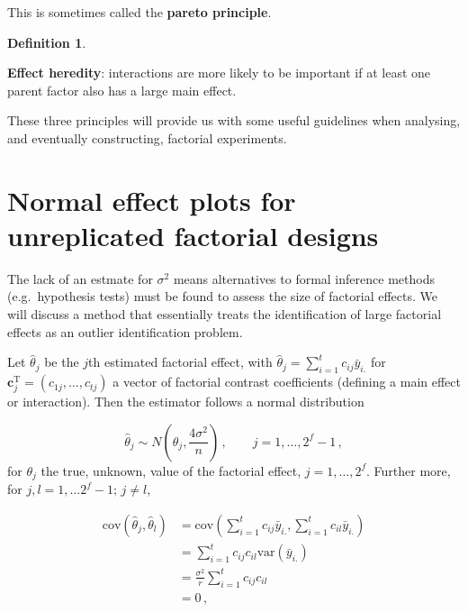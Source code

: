 \documentclass[
]{book}
\theoremstyle{definition}
\newtheorem{definition}{Definition}[chapter]
\theoremstyle{definition}
\theoremstyle{definition}
\theoremstyle{definition}
\theoremstyle{remark}
\begin{document}
This is sometimes called the \textbf{pareto principle}.

\begin{definition}
\protect\hypertarget{def:effect-heredity}{}\label{def:effect-heredity}

\textbf{Effect heredity}: interactions are more likely to be important if at least one parent factor also has a large main effect.

\end{definition}

These three principles will provide us with some useful guidelines when analysing, and eventually constructing, factorial experiments.

\hypertarget{unreplicated-normal-plots}{%
\section{Normal effect plots for unreplicated factorial designs}\label{unreplicated-normal-plots}}

The lack of an estmate for \(\sigma^2\) means alternatives to formal inference methods (e.g.~hypothesis tests) must be found to assess the size of factorial effects. We will discuss a method that essentially treats the identification of large factorial effects as an outlier identification problem.

Let \(\hat{\theta}_j\) be the \(j\)th estimated factorial effect, with \(\hat{\theta}_j = \sum_{i=1}^tc_{ij}\bar{y}_{i.}\) for \(\boldsymbol{c}_j^{\mathrm{T}} = (c_{1j}, \ldots, c_{tj})\) a vector of factorial contrast coefficients (defining a main effect or interaction). Then the estimator follows a normal distribution

\[
\hat{\theta}_j \sim N\left(\theta_j, \frac{4\sigma^2}{n}\right)\,,\qquad j = 1, \ldots, 2^f-1\,,
\]
for \(\theta_j\) the true, unknown, value of the factorial effect, \(j = 1,\ldots, 2^f\). Further more, for \(j, l = 1, \ldots 2^f-1; \, j\ne l\),

\begin{align*}
\mbox{cov}(\hat{\theta}_j, \hat{\theta}_l) & =  \mbox{cov}\left(\sum_{i=1}^tc_{ij}\bar{y}_{i.}, \sum_{i=1}^tc_{il}\bar{y}_{i.}\right) \\
& = \sum_{i=1}^tc_{ij}c_{il}\mbox{var}(\bar{y}_{i.}) \\
& = \frac{\sigma^2}{r} \sum_{i=1}^tc_{ij}c_{il} \\
& = 0\,, \\
\end{align*}
\end{document}
